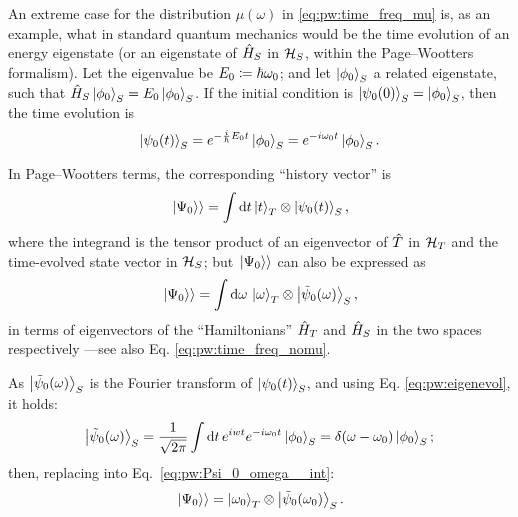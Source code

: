 An extreme case for the distribution %
$\mu(\omega)$ in \eqref{eq:pw:time_freq_mu} %
is, as an example, what in standard quantum mechanics would be the time evolution of an energy eigenstate
(or an eigenstate of $\hat{H}_S$ in $\mathcal{H}_S$, within the Page--Wootters formalism).
Let the eigenvalue be $E_0 \coloneqq \hbar\omega_{0}$;
and let $\ket{\phi_0}_S$ a related eigenstate, such that $\hat{H}_{S}\ket{\phi_0}_S = E_{0}\ket{\phi_0}_S$.
If the initial condition is $\ket{\psi_{0}(0)}_S = \ket{\phi_0}_S$, then the time evolution is
\begin{equation}\label{eq:pw:eigenevol}
  \ket{\psi_{0}(t)}_S = e^{-\frac{i}{\hbar}E_{0}t}\ket{\phi_0}_S = e^{-i \omega_{0} t}\ket{\phi_0}_S \text{.}
\end{equation}

In Page--Wootters terms, the corresponding ``history vector'' is
\begin{equation}\label{eq:pw:Psi_0_t}
  \left.\left| \Psi_0 \right\rangle\right\rangle = \int \dd{t} \ket{t}_T \otimes \ket{\psi_0(t)}_S \text{,}
\end{equation}
where the integrand is the tensor product of an eigenvector of $\hat{T}$ in $\mathcal{H}_T$
and the time-evolved state vector in $\mathcal{H}_S$;
but $\left.\left| \Psi_0 \right\rangle\right\rangle$ can also be expressed as
\begin{equation}\label{eq:pw:Psi_0_omega__int}
  \left.\left| \Psi_0 \right\rangle\right\rangle = \int \dd{\omega} \, \ket{\omega}_{T}\otimes\ket{\tilde{\psi}_{0}(\omega)}_{S} \text{,}
\end{equation}
in terms of eigenvectors of the ``Hamiltonians''
$\hat{H}_T$ and $\hat{H}_S$ in the two spaces respectively %
---see also Eq. \eqref{eq:pw:time_freq_nomu}.

As $\ket{\tilde{\psi}_{0}(\omega)}_{S}$ is the Fourier transform of $\ket{\psi_0(t)}_S$, and using Eq. \eqref{eq:pw:eigenevol}, it holds:
\[
  \ket{\tilde{\psi}_0(\omega)}_S = \frac{1}{\sqrt{2\pi}} \int \dd{t} e^{iwt} e^{-i\omega_{0}t} \ket{\phi_0}_S
  = \delta(\omega-\omega_0)\ket{\phi_0}_S \text{;}
\]
then, replacing into Eq.~\eqref{eq:pw:Psi_0_omega__int}:
\begin{equation}\label{eq:pw:Psi_0_omega}
  \left.\left| \Psi_0 \right\rangle\right\rangle = \ket{\omega_0}_{T}\otimes\ket{\tilde{\psi}_{0}(\omega_0)}_{S} \text{.}
\end{equation}


